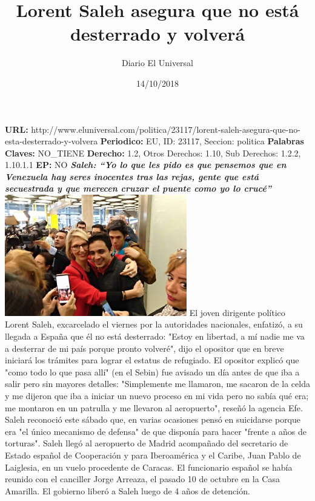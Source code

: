 \documentclass{article}%
\title{\textbf{Lorent Saleh asegura que no está desterrado y volverá}}%
\author{Diario El Universal}%
\date{14/10/2018}%
\begin{document}
%
\normalsize%
\maketitle%
\textbf{URL: }%
http://www.eluniversal.com/politica/23117/lorent{-}saleh{-}asegura{-}que{-}no{-}esta{-}desterrado{-}y{-}volvera\newline%
%
\textbf{Periodico: }%
EU, %
ID: %
23117, %
Seccion: %
politica\newline%
%
\textbf{Palabras Claves: }%
NO\_TIENE\newline%
%
\textbf{Derecho: }%
1.2, %
Otros Derechos: %
1.10, %
Sub Derechos: %
1.2.2, 1.10.1.1\newline%
%
\textbf{EP: }%
NO\newline%
\newline%
%
\textbf{\textit{Saleh: “Yo lo que les pido es que pensemos que en Venezuela hay seres inocentes tras las rejas, gente que está secuestrada y que merecen cruzar el puente como yo lo crucé”}}%
\newline%
\newline%
%
\includegraphics[width=300px]{105.jpg}%
\newline%
%
El joven dirigente político Lorent Saleh, excarcelado el viernes por la autoridades nacionales, enfatizó, a su llegada a España que él no está desterrado: "Estoy en libertad, a mí nadie me va a desterrar de mi país porque pronto volveré", dijo el opositor que en breve iniciará los trámites para lograr el estatus de refugiado.%
\newline%
%
El opositor explicó que "como todo lo que pasa allí" (en el Sebin) fue avisado un día antes de que iba a salir pero sin mayores detalles: "Simplemente me llamaron, me sacaron de la celda y me dijeron que iba a iniciar un nuevo proceso en mi vida pero no sabía qué era; me montaron en un patrulla y me llevaron al aeropuerto", reseñó la agencia Efe.%
\newline%
%
Saleh reconoció este sábado  que, en varias ocasiones pensó en suicidarse porque era "el único mecanismo de defensa" de que disponía para hacer "frente a años de torturas".%
\newline%
%
Saleh llegó al aeropuerto de Madrid acompañado del secretario de Estado español de Cooperación y para Iberoamérica y el Caribe, Juan Pablo de Laiglesia, en un vuelo procedente de Caracas.%
\newline%
%
El funcionario español se había reunido con el canciller Jorge Arreaza, el pasado 10 de octubre en la Casa Amarilla.%
\newline%
%
El gobierno liberó a Saleh luego de 4 años de detención.%
\newline%
%
\end{document}
